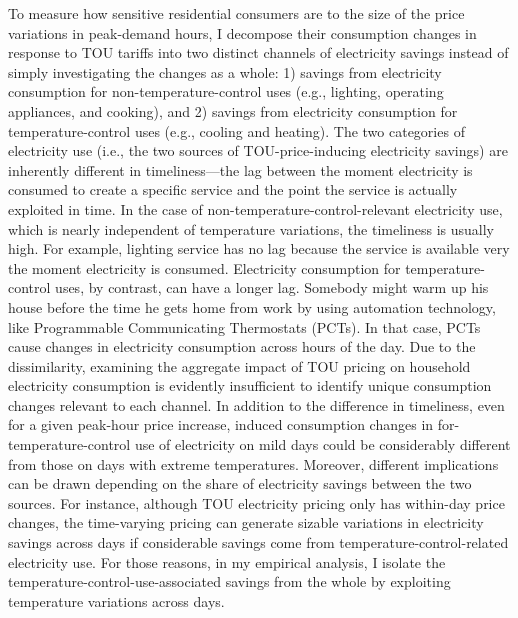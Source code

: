 To measure how sensitive residential consumers are to the size of the price variations in peak-demand hours, I decompose their consumption changes in response to TOU tariffs into two distinct channels of electricity savings instead of simply investigating the changes as a whole: 1) savings from electricity consumption for non-temperature-control uses (e.g., lighting, operating appliances, and cooking), and 2) savings from electricity consumption for temperature-control uses (e.g., cooling and heating). The two categories of electricity use (i.e., the two sources of TOU-price-inducing electricity savings) are inherently different in timeliness---the lag between the moment electricity is consumed to create a specific service and the point the service is actually exploited in time. In the case of non-temperature-control-relevant electricity use, which is nearly independent of temperature variations, the timeliness is usually high. For example, lighting service has no lag because the service is available very the moment electricity is consumed. Electricity consumption for temperature-control uses, by contrast, can have a longer lag. Somebody might warm up his house before the time he gets home from work by using automation technology, like  Programmable Communicating Thermostats (PCTs). In that case, PCTs cause changes in electricity consumption across hours of the day. Due to the dissimilarity, examining the aggregate impact of TOU pricing on household electricity consumption is evidently insufficient to identify unique consumption changes relevant to each channel. In addition to the difference in timeliness, even for a given peak-hour price increase, induced consumption changes in for-temperature-control use of electricity on mild days could be considerably different from those on days with extreme temperatures. Moreover, different implications can be drawn depending on the share of electricity savings between the two sources. For instance, although TOU electricity pricing only has within-day price changes, the time-varying pricing can generate sizable variations in electricity savings across days if considerable savings come from temperature-control-related electricity use. For those reasons, in my empirical analysis, I isolate the temperature-control-use-associated savings from the whole by exploiting temperature variations across days. 

